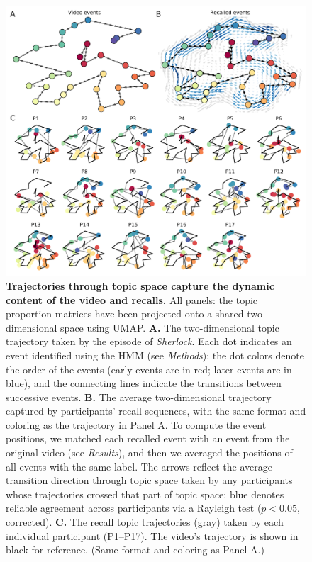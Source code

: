 \documentclass{article}
\begin{document}
\begin{figure}[tp]
\centering
\includegraphics[width=1\textwidth]{figs/trajectory}
\caption{\small \textbf{Trajectories through topic space capture the dynamic content of the video and recalls.}  All panels: the topic proportion matrices have been projected onto a shared two-dimensional space using UMAP.  \textbf{A.} The two-dimensional topic trajectory taken by the episode of \textit{Sherlock}.  Each dot indicates an event identified using the HMM (see \textit{Methods}); the dot colors denote the order of the events (early events are in red; later events are in blue), and the connecting lines indicate the transitions between successive events.  \textbf{B.} The average two-dimensional trajectory captured by participants' recall sequences, with the same format and coloring as the trajectory in Panel A.  To compute the event positions, we matched each recalled event with an event from the original video (see \textit{Results}), and then we averaged the positions of all events with the same label.  The arrows reflect the average transition direction through topic space taken by any participants whose trajectories crossed that part of topic space; blue denotes reliable agreement across participants via a Rayleigh test ($p < 0.05$, corrected).  \textbf{C.} The recall topic trajectories (gray) taken by each individual participant (P1--P17).  The video's trajectory is shown in black for reference.  (Same format and coloring as Panel A.)}
\label{fig:trajectory}
\end{figure}
\end{document}
